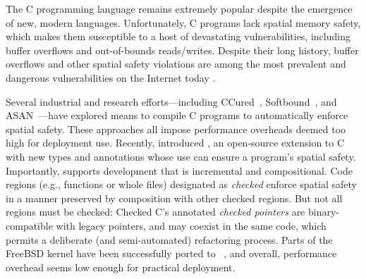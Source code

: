 

The C programming language remains extremely popular despite the
emergence of new, modern languages. Unfortunately, C programs lack
spatial memory safety, which makes them susceptible to a host
of devastating vulnerabilities, including buffer overflows and
out-of-bounds reads/writes. Despite their long history, buffer
overflows and other spatial safety violations are among the most
prevalent and dangerous vulnerabilities on the Internet today \cite{Zeng:2013:SRF:2534766.2534798}.


Several industrial and research efforts---including CCured~\cite{Necula2005},
Softbound~\cite{softbound}, and ASAN~\cite{Serebryany2012}---have
explored means to compile C programs 
to automatically enforce spatial safety. These
approaches all impose performance overheads deemed too high for
deployment use. Recently, \citet{Elliott2018} introduced \checkedc, an
open-source extension to C with new types and
annotations whose use can ensure a program’s spatial safety.
Importantly, \checkedc supports development that is 
incremental and compositional. Code regions (e.g.,
functions or whole files) designated as \emph{checked} enforce
spatial safety in a manner preserved by composition with
other checked regions. But not all regions must be checked: Checked
C's annotated \emph{checked pointers} are binary-compatible with legacy pointers, and
may coexist in the same code, which permits a deliberate (and
semi-automated) refactoring process. Parts of the FreeBSD kernel have
been successfully ported to \checkedc~\cite{duanrefactoring}, and overall, performance
overhead seems low enough for practical deployment.

